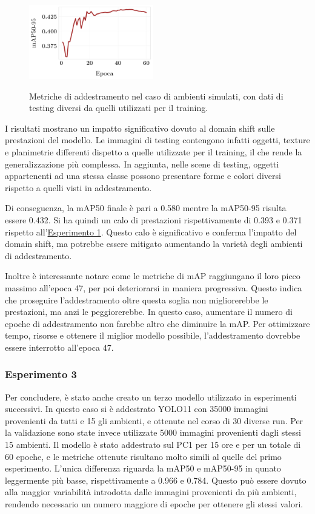 \documentclass[12pt]{report}
\begin{document}
\begin{figure}[h!]
	\hspace{0.01\textwidth}
	{\includegraphics[width=0.48\textwidth]{images/domain-shift/sim-to-sim/2/map50-95}}
	\caption{Metriche di addestramento nel caso di ambienti simulati, con dati di testing diversi da quelli utilizzati per il training.}
	\label{fig:sim-to-sim-graph-2}
\end{figure}

I risultati mostrano un impatto significativo dovuto al domain shift sulle prestazioni del modello. Le immagini di testing contengono infatti oggetti, texture e planimetrie differenti dispetto a quelle utilizzate per il training, il che rende la generalizzazione più complessa. In aggiunta, nelle scene di testing, oggetti appartenenti ad una stessa classe possono presentare forme e colori diversi rispetto a quelli visti in addestramento.

Di conseguenza, la mAP50 finale è pari a 0.580 mentre la mAP50-95 risulta essere 0.432. Si ha quindi un calo di prestazioni rispettivamente di 0.393 e 0.371 rispetto all'\hyperref[sec:esperimento_ds_1_1]{Esperimento 1}. Questo calo è significativo e conferma l'impatto del domain shift, ma potrebbe essere mitigato aumentando la varietà degli ambienti di addestramento.

Inoltre è interessante notare come le metriche di mAP raggiungano il loro picco massimo all'epoca 47, per poi deteriorarsi in maniera progressiva. Questo indica che proseguire l'addestramento oltre questa soglia non migliorerebbe le prestazioni, ma anzi le peggiorerebbe.  In questo caso, aumentare il numero di epoche di addestramento non farebbe altro che diminuire la mAP. Per ottimizzare tempo, risorse e ottenere il miglior modello possibile, l'addestramento dovrebbe essere interrotto all'epoca 47.

\subsubsection{Esperimento 3}
\label{sec:esperimento_ds_1_3}

Per concludere, è stato anche creato un terzo modello utilizzato in esperimenti successivi. In questo caso si è addestrato YOLO11 con 35000 immagini provenienti da tutti e 15 gli ambienti, e ottenute nel corso di 30 diverse run. Per la validazione sono state invece utilizzate 5000 immagini provenienti dagli stessi 15 ambienti. Il modello è stato addestrato sul PC1 per 15 ore e per un totale di 60 epoche, e le metriche ottenute risultano molto simili al quelle del primo esperimento. L'unica differenza riguarda la mAP50 e mAP50-95 in qunato leggermente più basse, rispettivamente a 0.966 e 0.784. Questo può essere dovuto alla maggior variabilità introdotta dalle immagini provenienti da più ambienti, rendendo necessario un numero maggiore di epoche per ottenere gli stessi valori.
\end{document}
